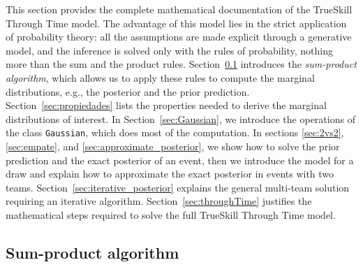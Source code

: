 \documentclass[article]{jss}
\begin{document}
This section provides the complete mathematical documentation of the TrueSkill Through Time model. 
The advantage of this model lies in the strict application of probability theory: all the assumptions are made explicit through a generative model, and the inference is solved only with the rules of probability, nothing more than the sum and the product rules. 
Section~\ref{sec:sumProductAlgorithm} introduces the \emph{sum-product algorithm}, which allows us to apply these rules to compute the marginal distributions, e.g., the posterior and the prior prediction. 
Section~\ref{sec:propiedades} lists the properties needed to derive the marginal distributions of interest. 
In Section~\ref{sec:Gaussian}, we introduce the operations of the class \texttt{Gaussian}, which does most of the computation. 
In sections \ref{sec:2vs2}, \ref{sec:empate}, and \ref{sec:approximate_posterior}, we show how to solve the prior prediction and the exact posterior of an event, then we introduce the model for a draw and explain how to approximate the exact posterior in events with two teams. 
Section~\ref{sec:iterative_posterior} explains the general multi-team solution requiring an iterative algorithm. 
Section~\ref{sec:throughTime} justifies the mathematical steps required to solve the full TrueSkill Through Time model. 

\subsection{Sum-product algorithm} \label{sec:sumProductAlgorithm}
\end{document}
